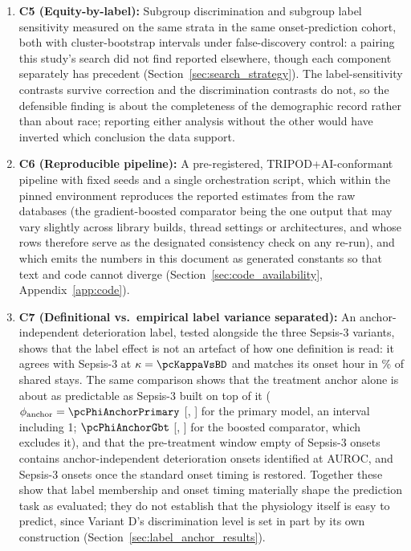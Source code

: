 \begin{enumerate}
    \item \textbf{C5 (Equity-by-label):} Subgroup discrimination and subgroup
    label sensitivity measured on the same strata in the same
    onset-prediction cohort, both with cluster-bootstrap intervals under
    false-discovery control: a pairing this study's search did not find
    reported elsewhere, though each component separately has precedent
    (Section~\ref{sec:search_strategy}). The label-sensitivity contrasts
    survive correction and the discrimination contrasts do not, so the
    defensible finding is about the completeness of the demographic record
    rather than about race; reporting either analysis without the other would
    have inverted which conclusion the data support.

    \item \textbf{C6 (Reproducible pipeline):} A pre-registered,
    TRIPOD+AI-conformant pipeline with fixed seeds and a single orchestration
    script, which within the pinned environment reproduces the reported
    estimates from the raw databases (the gradient-boosted comparator being the
    one output that may vary slightly across library builds, thread settings or
    architectures, and whose rows therefore serve as the designated consistency
    check on any re-run), and which emits the numbers in this document as generated
    constants so that text and code cannot diverge
    (Section~\ref{sec:code_availability}, Appendix~\ref{app:code}).

    \item \textbf{C7 (Definitional vs.\ empirical label variance separated):}
    An anchor-independent deterioration label, tested alongside the three
    Sepsis-3 variants, shows that the label effect is not an artefact of how one
    definition is read: it agrees with Sepsis-3 at $\kappa = \pcKappaVsBD$ and
    matches its onset hour in \pcPctExactMatchD\% of shared stays. The same
    comparison shows that the treatment anchor alone is about as predictable as
    Sepsis-3 built on top of it ($\phi_{\text{anchor}} = \pcPhiAnchorPrimary$
    [\pcPhiAnchorCiLoPrimary, \pcPhiAnchorCiHiPrimary] for the primary model,
    an interval including 1; $\pcPhiAnchorGbt$
    [\pcPhiAnchorCiLoGbt, \pcPhiAnchorCiHiGbt] for the boosted comparator,
    which excludes it), and that the pre-treatment window empty of Sepsis-3
    onsets contains
    \pcPreTreatOnsetsVarD{} anchor-independent deterioration onsets
    identified at \pcPreTreatAurocPrimaryD{} AUROC, and
    \pcPreTreatOnsetsVarF{} Sepsis-3 onsets once the standard onset timing is
    restored. Together these show that label membership and onset timing
    materially shape the prediction task as evaluated; they do not establish
    that the physiology itself is easy to predict, since Variant D's
    discrimination level is set in part by its own construction
    (Section~\ref{sec:label_anchor_results}).
\end{enumerate}



